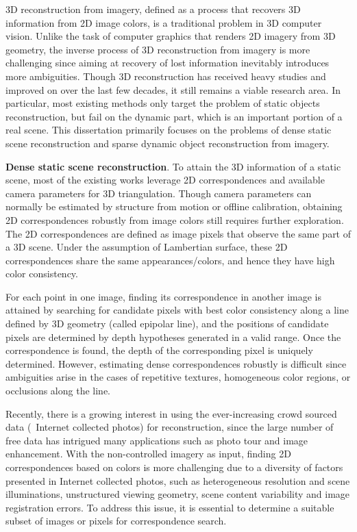 3D reconstruction from imagery, defined as a process that recovers 3D information from 2D image colors, is a traditional problem in 3D computer vision.
Unlike the task of computer graphics that renders 2D imagery from 3D geometry, the inverse process of 3D reconstruction from imagery is more challenging since aiming at recovery of lost information inevitably introduces more ambiguities. Though 3D reconstruction has received heavy studies and improved on over the last few decades, it still remains a viable research area. 
In particular, most existing methods only target the problem of static objects reconstruction, but fail on the dynamic part, which is an important portion of a real scene.
This dissertation primarily focuses on the problems of dense static scene reconstruction and sparse dynamic object reconstruction from imagery.

\textbf{Dense static scene reconstruction}.
To attain the 3D information of a static scene, most of the existing works leverage 2D correspondences and available camera parameters for 3D triangulation. Though camera parameters can normally be estimated by structure from motion or offline calibration, obtaining 2D correspondences robustly from image colors still requires further exploration. The 2D correspondences are defined as image pixels that observe the same part of a 3D scene. Under the assumption of Lambertian surface, these 2D correspondences share the same appearances/colors, and hence they have high color consistency.

For each point in one image, finding its correspondence in another image is attained by searching for candidate pixels with best color consistency along a line defined by 3D geometry (called epipolar line), and the positions of candidate pixels are determined by depth hypotheses generated in a valid range. Once the correspondence is found, the depth of the corresponding pixel is uniquely determined. However, estimating dense correspondences robustly is difficult since ambiguities arise in the cases of repetitive textures, homogeneous color regions, or occlusions along the line. 

Recently, there is a growing interest in using the ever-increasing crowd sourced data (\ie~Internet collected photos) for reconstruction, since the large number of free data has intrigued many applications such as photo tour and image enhancement. With the non-controlled imagery as input, finding 2D correspondences based on colors is more challenging due to a diversity of factors presented in Internet collected photos, such as heterogeneous resolution and scene illuminations, unstructured viewing geometry, scene content variability and image registration errors. To address this issue, it is essential to determine a suitable subset of images or pixels for correspondence search. 

